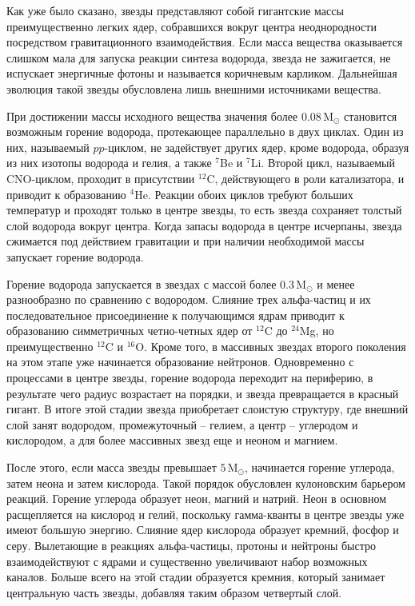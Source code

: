 \documentclass[a4paper, 14pt]{extarticle}
\def\M{\mathrm{M}_\odot}
\begin{document}
Как уже было сказано, звезды представляют собой гигантские массы 
преимущественно легких ядер, собравшихся вокруг центра неоднородности 
посредством гравитационного взаимодействия. Если масса вещества 
оказывается слишком мала для запуска реакции синтеза водорода, звезда не 
зажигается, не испускает энергичные фотоны и называется коричневым 
карликом. Дальнейшая эволюция такой звезды обусловлена лишь внешними 
источниками вещества.

При достижении массы исходного вещества значения более $0.08\,\M$ 
становится возможным горение водорода, протекающее параллельно в двух 
циклах. Один из них, называемый $pp$-циклом, не задействует других ядер, 
кроме водорода, образуя из них изотопы водорода и гелия, а также $^7$Be 
и $^7$Li. Второй цикл, называемый CNO-циклом, проходит в присутствии 
$^{12}$C, действующего в роли катализатора, и приводит к образованию 
$^4$He. Реакции обоих циклов требуют больших температур и проходят 
только в центре звезды, то есть звезда сохраняет толстый слой водорода 
вокруг центра. Когда запасы водорода в центре исчерпаны, звезда 
сжимается под действием гравитации и при наличии необходимой массы 
запускает горение водорода.

Горение водорода запускается в звездах с массой более $0.3\,\M$ и менее 
разнообразно по сравнению с водородом. Слияние трех альфа-частиц и их 
последовательное присоединение к получающимся ядрам приводит 
к образованию симметричных четно-четных ядер от $^{12}$C до $^{24}$Mg, но 
преимущественно $^{12}$C и $^{16}$O. Кроме того, в массивных звездах 
второго поколения на этом этапе уже начинается образование нейтронов. 
Одновременно с процессами в центре звезды, горение водорода переходит на 
периферию, в результате чего радиус возрастает на порядки, и звезда 
превращается в красный гигант. В итоге этой стадии звезда приобретает 
слоистую структуру, где внешний слой занят водородом, промежуточный -- 
гелием, а центр -- углеродом и кислородом, а для более массивных звезд 
еще и неоном и магнием.

После этого, если масса звезды превышает $5\,\M$, начинается горение 
углерода, затем неона и затем кислорода. Такой порядок обусловлен 
кулоновским барьером реакций. Горение углерода образует неон, магний 
и натрий. Неон в основном расщепляется на кислород и гелий, поскольку 
гамма-кванты в центре звезды уже имеют большую энергию. Слияние ядер 
кислорода образует кремний, фосфор и серу. Вылетающие в реакциях 
альфа-частицы, протоны и нейтроны быстро взаимодействуют с ядрами 
и существенно увеличивают набор возможных каналов. Больше всего на этой 
стадии образуется кремния, который занимает центральную часть звезды, 
добавляя таким образом четвертый слой.
\end{document}
